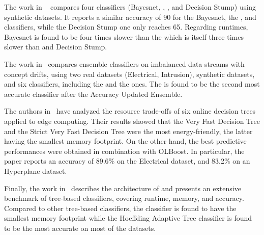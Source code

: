 The work in ~\cite{kaur2020} compares four classifiers (Bayesnet,
\hoeffdingtree, \naivebayes, and Decision Stump) using synthetic datasets.  It
reports a similar accuracy of 90 for the Bayesnet, the \hoeffdingtree, and
\naivebayes classifiers, while the Decision Stump one only reaches 65. Regarding
runtimes, Bayesnet is found to be four times slower than the \hoeffdingtree
which is itself three times slower than \naivebayes and Decision Stump.

The work in~\cite{priya2020comprehensive} compares ensemble classifiers on
imbalanced data streams with concept drifts, using two real datasets
(Electrical, Intrusion), synthetic datasets, and six classifiers, including the
\naivebayes and the \hoeffdingtree ones. The \hoeffdingtree is found to be the
second most accurate classifier after the Accuracy Updated Ensemble.

The authors in~\cite{lopes2020evaluating} have analyzed the resource trade-offs
of six online decision trees applied to edge computing. Their results showed
that the Very Fast Decision Tree and the Strict Very Fast Decision Tree were the
most energy-friendly, the latter having the smallest memory footprint. On the
other hand, the best predictive performances were obtained in combination with
OLBoost. In particular, the paper reports an accuracy of 89.6\% on the
Electrical dataset, and 83.2\% on an Hyperplane dataset.

Finally, the work in~\cite{StreamDM-CPP} describes the architecture of
\streamdmcpp and presents an extensive benchmark of tree-based classifiers,
covering runtime, memory, and accuracy. Compared to other tree-based
classifiers, the \hoeffdingtree classifier is found to have the smallest memory
footprint while the Hoeffding Adaptive Tree classifier is found to be the most
accurate on most of the datasets. 

